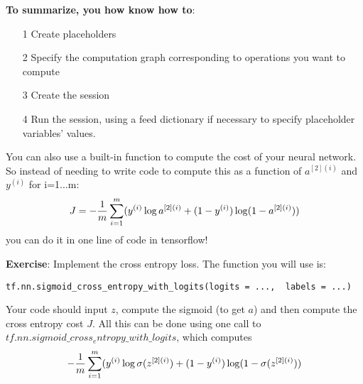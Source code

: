 {\color{red}\textbf {To summarize, you how know how to}:
\begin{itemize}
\item[1] Create placeholders
\item[2] Specify the computation graph corresponding to operations you want to compute
\item[3] Create the session
\item[4] Run the session, using a feed dictionary if necessary to specify placeholder variables' values.
\end{itemize}
}




You can also use a built-in function to compute the cost of your neural network. So instead of needing to write code to compute this as a function of $a^{[2](i)}$ and $y^{(i)}$ for i=1...m: 
\begin{align}
J = - \frac{1}{m}  \sum_{i = 1}^m  \large ( \small y^{(i)} \log a^{ [2] (i)} + (1-y^{(i)})\log (1-a^{ [2] (i)} )\large )
\end{align}
you can do it in one line of code in tensorflow!

{\textbf {Exercise}}: Implement the cross entropy loss. The function you will use is: 
\begin{verbatim}  
tf.nn.sigmoid_cross_entropy_with_logits(logits = ...,  labels = ...)
\end{verbatim}  

Your code should input $z$, compute the sigmoid (to get $a$) and then compute the cross entropy cost $J$. All this can be done using one call to $tf.nn.sigmoid\_cross_entropy\_with\_logits$, which computes
\begin{align*}
- \frac{1}{m}  \sum_{i = 1}^m  \large ( \small y^{(i)} \log \sigma(z^{[2](i)}) + (1-y^{(i)})\log (1-\sigma(z^{[2](i)})\large )
\end{align*}


